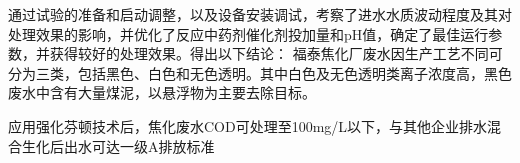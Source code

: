 通过试验的准备和启动调整，以及设备安装调试，考察了进水水质波动程度及其对处理效果的影响，并优化了反应中药剂催化剂投加量和pH值，确定了最佳运行参数，并获得较好的处理效果。得出以下结论：
福泰焦化厂废水因生产工艺不同可分为三类，包括黑色、白色和无色透明。其中白色及无色透明类离子浓度高，黑色废水中含有大量煤泥，以悬浮物为主要去除目标。\par
应用强化芬顿技术后，焦化废水COD可处理至100mg/L以下，与其他企业排水混合生化后出水可达一级A排放标准\par
